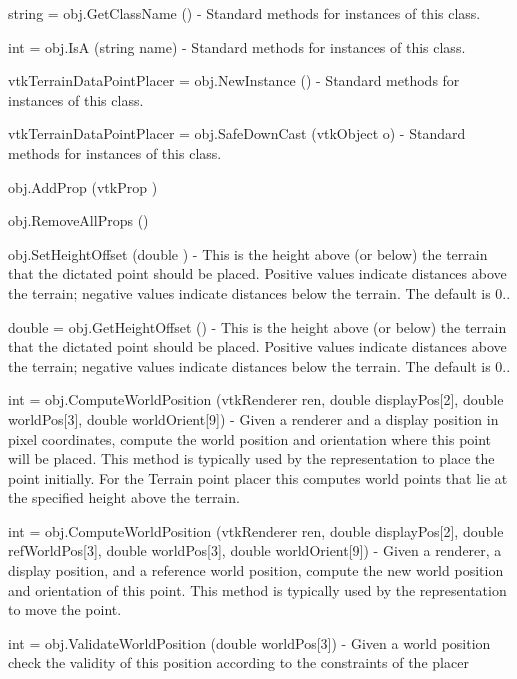 \begin{DoxyItemize}
\item {\ttfamily string = obj.\-Get\-Class\-Name ()} -\/ Standard methods for instances of this class.  
\item {\ttfamily int = obj.\-Is\-A (string name)} -\/ Standard methods for instances of this class.  
\item {\ttfamily vtk\-Terrain\-Data\-Point\-Placer = obj.\-New\-Instance ()} -\/ Standard methods for instances of this class.  
\item {\ttfamily vtk\-Terrain\-Data\-Point\-Placer = obj.\-Safe\-Down\-Cast (vtk\-Object o)} -\/ Standard methods for instances of this class.  
\item {\ttfamily obj.\-Add\-Prop (vtk\-Prop )}  
\item {\ttfamily obj.\-Remove\-All\-Props ()}  
\item {\ttfamily obj.\-Set\-Height\-Offset (double )} -\/ This is the height above (or below) the terrain that the dictated point should be placed. Positive values indicate distances above the terrain; negative values indicate distances below the terrain. The default is 0..  
\item {\ttfamily double = obj.\-Get\-Height\-Offset ()} -\/ This is the height above (or below) the terrain that the dictated point should be placed. Positive values indicate distances above the terrain; negative values indicate distances below the terrain. The default is 0..  
\item {\ttfamily int = obj.\-Compute\-World\-Position (vtk\-Renderer ren, double display\-Pos\mbox{[}2\mbox{]}, double world\-Pos\mbox{[}3\mbox{]}, double world\-Orient\mbox{[}9\mbox{]})} -\/ Given a renderer and a display position in pixel coordinates, compute the world position and orientation where this point will be placed. This method is typically used by the representation to place the point initially. For the Terrain point placer this computes world points that lie at the specified height above the terrain.  
\item {\ttfamily int = obj.\-Compute\-World\-Position (vtk\-Renderer ren, double display\-Pos\mbox{[}2\mbox{]}, double ref\-World\-Pos\mbox{[}3\mbox{]}, double world\-Pos\mbox{[}3\mbox{]}, double world\-Orient\mbox{[}9\mbox{]})} -\/ Given a renderer, a display position, and a reference world position, compute the new world position and orientation of this point. This method is typically used by the representation to move the point.  
\item {\ttfamily int = obj.\-Validate\-World\-Position (double world\-Pos\mbox{[}3\mbox{]})} -\/ Given a world position check the validity of this position according to the constraints of the placer  

\end{DoxyItemize}
